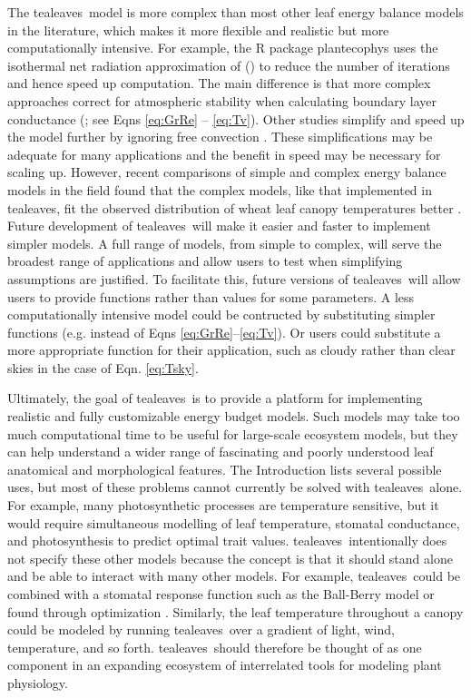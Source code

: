 \documentclass[11pt, oneside]{article}
\newcommand{\pkg}[1]{{\fontseries{b}\selectfont #1}}
\newcommand{\tealeaves}{\pkg{tealeaves}}
\begin{document}
The \tealeaves~model is more complex than most other leaf energy balance models in the literature, which makes it more flexible and realistic but more computationally intensive. For example, the R package \pkg{plantecophys} \citep{Duursma_2015} uses the isothermal net radiation approximation of \citeauthor{Leuning_etal_1995} (\citeyear{Leuning_etal_1995}) to reduce the number of iterations and hence speed up computation. The main difference is that more complex approaches correct for atmospheric stability when calculating boundary layer conductance (\cite{Webber_etal_2017}; see Eqns \ref{eq:GrRe} -- \ref{eq:Tv}). Other studies simplify and speed up the model further by ignoring free convection \citep{Buckley_etal_2014}. These simplifications may be adequate for many applications and the benefit in speed may be necessary for scaling up. However, recent comparisons of simple and complex energy balance models in the field found that the complex models, like that implemented in \tealeaves, fit the observed distribution of wheat leaf canopy temperatures better \citep{Webber_etal_2017}. Future development of \tealeaves~will make it easier and faster to implement simpler models. A full range of models, from simple to complex, will serve the broadest range of applications and allow users to test when simplifying assumptions are justified. To facilitate this, future versions of \tealeaves~will allow users to provide functions rather than values for some parameters. A less computationally intensive model could be contructed by substituting simpler functions (e.g. instead of Eqns \ref{eq:GrRe}--\ref{eq:Tv}). Or users could substitute a more appropriate function for their application, such as cloudy rather than clear skies in the case of Eqn. \ref{eq:Tsky}.

Ultimately, the goal of \tealeaves~is to provide a platform for implementing realistic and fully customizable energy budget models. Such models may take too much computational time to be useful for large-scale ecosystem models, but they can help understand a wider range of fascinating and poorly understood leaf anatomical and morphological features. The Introduction lists several possible uses, but most of these problems cannot currently be solved with \tealeaves~alone. For example, many photosynthetic processes are temperature sensitive, but it would require simultaneous modelling of leaf temperature, stomatal conductance, and photosynthesis to predict optimal trait values. \tealeaves~intentionally does not specify these other models because the concept is that it should stand alone and be able to interact with many other models. For example, \tealeaves~could be combined with a stomatal response function such as the Ball-Berry model \citep{Ball_etal_1987} or found through optimization \citep{Buckley_etal_2014, Duursma_2015, Muir_2019c}. Similarly, the leaf temperature throughout a canopy could be modeled by running \tealeaves~over a gradient of light, wind, temperature, and so forth. \tealeaves~should therefore be thought of as one component in an expanding ecosystem of interrelated tools for modeling plant physiology.
\end{document}
